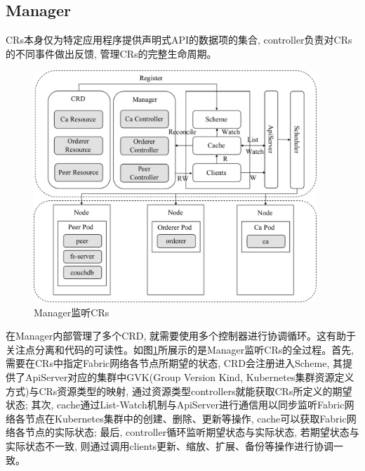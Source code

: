 \subsection{Manager}

CRs本身仅为特定应用程序提供声明式API的数据项的集合, controller负责对CRs的不同事件做出反馈, 管理CRs的完整生命周期。

\begin{figure}[h] %
    \centering %
    \includegraphics[width=0.95\textwidth]{FIGs/chapter4/manager.pdf} %
    \caption{Manager监听CRs} %
    \label{manager} %
\end{figure}%

在Manager内部管理了多个CRD, 就需要使用多个控制器进行协调循环。这有助于关注点分离和代码的可读性。如图\ref{manager}所展示的是Manager监听CRs的全过程。首先, 需要在CRs中指定Fabric网络各节点所期望的状态, CRD会注册进入Scheme, 其提供了ApiServer对应的集群中GVK(Group Version Kind, Kubernetes集群资源定义方式)与CRs资源类型的映射, 通过资源类型controllers就能获取CRs所定义的期望状态; 其次, cache通过List-Watch机制与ApiServer进行通信用以同步监听Fabric网络各节点在Kubernetes集群中的创建、删除、更新等操作, cache可以获取Fabric网络各节点的实际状态; 最后, controller循环监听期望状态与实际状态, 若期望状态与实际状态不一致, 则通过调用clients更新、缩放、扩展、备份等操作进行协调一致。


